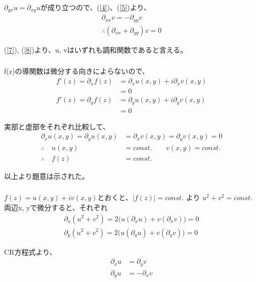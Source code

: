 \documentclass[dvipdfmx,a4paper]{jsarticle}
\begin{document}
$\partial_{yx} u = \partial_{xy} u$が成り立つので、(\ref{4})、(\ref{5})より、
\begin{eqnarray}
\partial_{xx} v = -\partial_{yy} v \nonumber\\
\label{8}
\therefore (\partial_{xx}+\partial_{yy}) v = 0
\end{eqnarray}

(\ref{7}), (\ref{8})より、u, vはいずれも調和関数であると言える。\\

\subsubsection{}
f(z)の導関数は微分する向きによらないので、
\begin{align*}
f'(z) = \partial_x f(z) &= \partial_x u(x, y) + i\partial_x v(x, y)\\
&= 0\\
f'(z) = \partial_y f(z) &= \partial_y u(x, y) + i\partial_y v(x, y)\\
&= 0
\end{align*}

実部と虚部をそれぞれ比較して、
\begin{align*}
\partial_x u(x, y) = \partial_y u(x, y) &= \partial_x v(x, y) = \partial_y v(x, y) = 0\\
\therefore \quad u(x, y) &= const. \qquad v(x, y) = const.\\
\therefore \quad f(z) &= const.
\end{align*}

以上より題意は示された。\\

\subsubsection{}
$f(z) = u(x, y) + i v(x, y)$とおくと、$|f(z)| = const.$ より $u^2 + v^2 = const.$
両辺x, yで微分すると、それぞれ
\begin{eqnarray}
\label{9}
\partial_x(u^2 + v^2) = 2\bigl(u(\partial_x u) + v(\partial_x v)\bigr) = 0\\
\label{10}
\partial_y(u^2 + v^2) = 2\bigl(u(\partial_y u) + v(\partial_y v)\bigr) = 0
\end{eqnarray}

CR方程式より、
\begin{eqnarray}
\label{11}
\partial_x u &= \partial_y v\\
\label{12}
\partial_y u &= -\partial_x v
\end{eqnarray}
\end{document}
